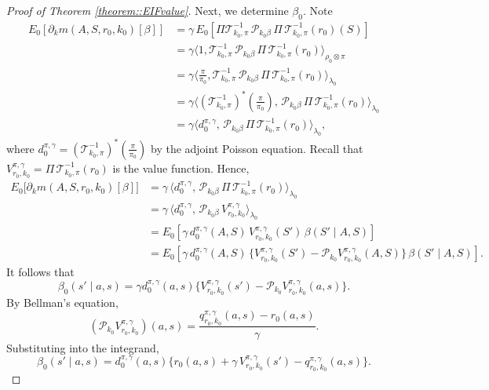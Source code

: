\documentclass[11pt]{article}
\theoremstyle{plain}
\begin{document}
\begin{proof}[Proof of Theorem \ref{theorem::EIFvalue}]
Next, we determine $\beta_0$. Note
\begin{align*}
    E_0 [\partial_k m(A,S,r_0,k_0)[\beta] ]  
    &= \gamma\, E_0\!\left[\Pi \mathcal{T}_{k_0,\pi}^{-1}\,\mathcal{P}_{k_0\beta}\,\Pi\,\mathcal{T}_{k_0,\pi}^{-1}(r_0)(S)\right] \\
    &=  \gamma \langle 1, \mathcal{T}_{k_0,\pi}^{-1}\,\mathcal{P}_{k_0\beta}\,\Pi\,\mathcal{T}_{k_0,\pi}^{-1}(r_0) \rangle_{\rho_0 \otimes \pi} \\
     &=  \gamma  \langle \tfrac{\pi}{\pi_0}, \mathcal{T}_{k_0,\pi}^{-1}\,\mathcal{P}_{k_0\beta}\,\Pi\,\mathcal{T}_{k_0,\pi}^{-1}(r_0) \rangle_{\lambda_0}\\
      &=  \gamma \langle (\mathcal{T}_{k_0,\pi}^{-1})^*(\tfrac{\pi}{\pi_0}),  \, \mathcal{P}_{k_0\beta}\,\Pi\,\mathcal{T}_{k_0,\pi}^{-1}(r_0) \rangle_{\lambda_0} \\
       &=  \gamma  \langle d_0^{\pi,\gamma},  \, \mathcal{P}_{k_0\beta}\,\Pi\,\mathcal{T}_{k_0,\pi}^{-1}(r_0) \rangle_{\lambda_0},
\end{align*}
where $d_0^{\pi,\gamma} =  (\mathcal{T}_{k_0,\pi}^{-1})^*(\tfrac{\pi}{\pi_0})$ by the adjoint Poisson equation. Recall that $V_{r_0, k_0}^{\pi,\gamma} = \Pi\,\mathcal{T}_{k_0,\pi}^{-1}(r_0)$ is the value function. Hence,
\begin{align*}
    E_0 \big[\partial_k m(A,S,r_0,k_0)[\beta] \big] 
    &= \gamma\, \langle d_0^{\pi,\gamma},\, \mathcal{P}_{k_0\beta}\,\Pi\,\mathcal{T}_{k_0,\pi}^{-1}(r_0) \rangle_{\lambda_0} \\
    &= \gamma\, \langle d_0^{\pi,\gamma},\, \mathcal{P}_{k_0\beta}\,V_{r_0, k_0}^{\pi,\gamma}  \rangle_{\lambda_0} \\
    &= E_0\!\left[\gamma\, d_0^{\pi,\gamma}(A,S)\, V_{r_0, k_0}^{\pi,\gamma}(S')\, \beta(S'\mid A,S)\right] \\
    &= E_0\!\left[\gamma\, d_0^{\pi,\gamma}(A,S)\,\bigl\{V_{r_0, k_0}^{\pi,\gamma}(S') - \mathcal{P}_{k_0}V_{r_0, k_0}^{\pi,\gamma}(A,S)\bigr\}\, \beta(S'\mid A,S)\right].
\end{align*}
 It follows that
$$\beta_0(s' \mid a, s) = \gamma d_0^{\pi,\gamma}(a, s) \{V_{r_0, k_0}^{\pi,\gamma} (s') - \mathcal{P}_{k_0} V_{r_0, k_0}^{\pi,\gamma}(a,s)\} .$$
By Bellman’s equation,
\[
(\mathcal{P}_{k_0} V_{r_0,k_0}^{\pi,\gamma})(a,s)
= \frac{q_{r_0,k_0}^{\pi,\gamma}(a,s) - r_0(a,s)}{\gamma}.
\]
Substituting into the integrand,
\[
\beta_0(s' \mid a, s) = d_0^{\pi,\gamma}(a,s)\Big\{r_0(a,s) + \gamma\,V_{r_0,k_0}^{\pi,\gamma}(s') - q_{r_0,k_0}^{\pi,\gamma}(a,s)  \Big\}.
\]



\end{proof}
\end{document}
